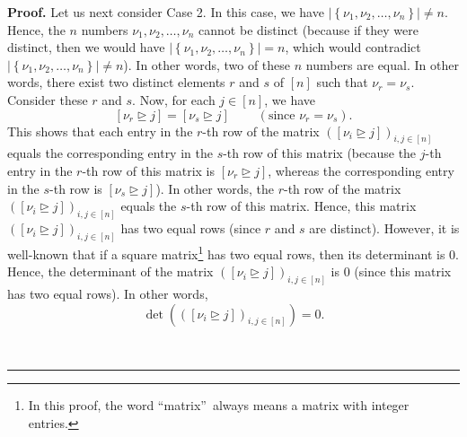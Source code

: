 \documentclass[numbers=enddot,12pt,final,onecolumn,notitlepage,english]{scrartcl}%
\theoremstyle{definition}
\newenvironment{proof}[1][Proof]{\noindent\textbf{#1.} }{\ \rule{0.5em}{0.5em}}
\newenvironment{verlong}{}{}
\begin{document}
\begin{proof}
\begin{verlong}
Let us next consider Case 2. In this case, we have $\left\vert \left\{
\nu_{1},\nu_{2},\ldots,\nu_{n}\right\}  \right\vert \neq n$. Hence, the $n$
numbers $\nu_{1},\nu_{2},\ldots,\nu_{n}$ cannot be distinct (because if they
were distinct, then we would have $\left\vert \left\{  \nu_{1},\nu_{2}%
,\ldots,\nu_{n}\right\}  \right\vert =n$, which would contradict $\left\vert
\left\{  \nu_{1},\nu_{2},\ldots,\nu_{n}\right\}  \right\vert \neq n$). In
other words, two of these $n$ numbers are equal. In other words, there exist
two distinct elements $r$ and $s$ of $\left[  n\right]  $ such that $\nu
_{r}=\nu_{s}$. Consider these $r$ and $s$. Now, for each $j\in\left[
n\right]  $, we have%
\[
\left[  \nu_{r}\trianglerighteq j\right]  =\left[  \nu_{s}\trianglerighteq
j\right]  \ \ \ \ \ \ \ \ \ \ \left(  \text{since }\nu_{r}=\nu_{s}\right)  .
\]
This shows that each entry in the $r$-th row of the matrix $\left(  \left[
\nu_{i}\trianglerighteq j\right]  \right)  _{i,j\in\left[  n\right]  }$ equals
the corresponding entry in the $s$-th row of this matrix (because the $j$-th
entry in the $r$-th row of this matrix is $\left[  \nu_{r}\trianglerighteq
j\right]  $, whereas the corresponding entry in the $s$-th row is $\left[
\nu_{s}\trianglerighteq j\right]  $). In other words, the $r$-th row of the
matrix $\left(  \left[  \nu_{i}\trianglerighteq j\right]  \right)
_{i,j\in\left[  n\right]  }$ equals the $s$-th row of this matrix. Hence, this
matrix $\left(  \left[  \nu_{i}\trianglerighteq j\right]  \right)
_{i,j\in\left[  n\right]  }$ has two equal rows (since $r$ and $s$ are
distinct). However, it is well-known that if a square matrix\footnote{In this
proof, the word \textquotedblleft matrix\textquotedblright\ always means a
matrix with integer entries.} has two equal rows, then its determinant is $0$.
Hence, the determinant of the matrix $\left(  \left[  \nu_{i}\trianglerighteq
j\right]  \right)  _{i,j\in\left[  n\right]  }$ is $0$ (since this matrix has
two equal rows). In other words,
\begin{equation}
\det\left(  \left(  \left[  \nu_{i}\trianglerighteq j\right]  \right)
_{i,j\in\left[  n\right]  }\right)  =0. \label{pf.lem.xi-det.c2.det=0}%
\end{equation}



\end{verlong}
\end{proof}
\end{document}
